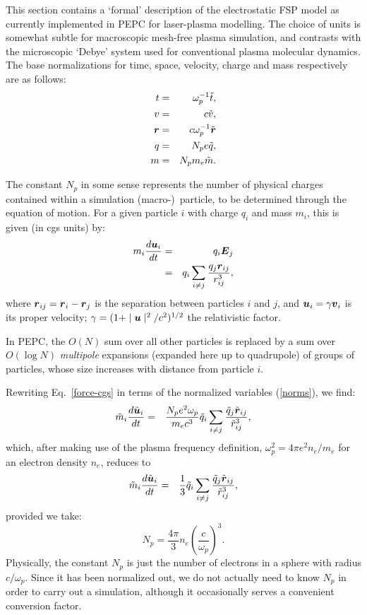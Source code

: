 \documentclass[11pt,psfig]{article}
\def\be{\begin{equation}}
\def\ee{\end{equation}}
\def\bea{\begin{eqnarray}}
\def\eea{\end{eqnarray}}
\newcommand{\bm}[1]{\mbox{\boldmath$#1$}}
\newcommand{\ddt}[1]{\frac{d #1}{d t}}
\newcommand{\half}{{1/2}}
\begin{document}
This section contains a `formal' description of the electrostatic FSP model as
currently implemented in PEPC for laser-plasma modelling.  The choice of units is somewhat subtle for
macroscopic mesh-free plasma simulation, and contrasts with the microscopic `Debye' system used for conventional plasma molecular dynamics.  The base normalizations for
time, space, velocity, charge and mass respectively are as follows:
\bea 
t &=& \omega_p^{-1}\tilde{t}, \nonumber\\ 
v&=&c\tilde{v}, \nonumber \\
 \bm{r} &=& c \omega_p^{-1}\tilde{\bm{r}} \nonumber \\
q&=& N_p e \tilde{q}, \nonumber \\ 
m &=& N_p m_e \tilde{m}.
\label{norms}
\eea

The constant $N_p$ in some sense represents the number of physical charges contained within a
simulation (macro-)~particle, to be determined through the equation of motion.
For a given particle $i$ with charge $q_i$ and mass $m_i$, this is given (in
cgs units) by: 
\bea
m_i \ddt{\bm{u}_i} &=& q_i \bm{E}_j \nonumber \\
              &=& q_i\sum_{i \neq j} \frac{q_j\bm{r}_{ij}}{r_{ij}^3},
\label{force-cgs}
\eea
where $\bm{r}_{ij} = \bm{r}_i-\bm{r}_j$ is the separation between particles $i$
and $j$, and $\bm{u}_i = \gamma \bm{v}_i$ is its proper velocity;
$\gamma=(1 +\mid\bm{u}\mid^2/c^2)^\half$
the relativistic factor.

In PEPC, the $O(N)$ sum over all other particles is replaced by a sum
over $O(\log N)$ \textit{multipole} expansions (expanded here up to quadrupole) of groups of particles, whose size
increases with distance from particle $i$.  
 
Rewriting Eq.~\ref{force-cgs} in terms of the normalized variables
(\ref{norms}), we find:
\bea
\tilde{m}_i \ddt{\tilde{\bm{u}}_i} 
    &=& \frac{N_pe^2\omega_p}{m_ec^3}\tilde{q}_i\sum_{i \neq j} \frac{\tilde{q}_j\tilde{\bm{r}}_{ij}}{\tilde{r}_{ij}^3},
              \nonumber 
\eea
which, after making use of the plasma frequency definition, $\omega_p^2 =
4\pi e^2n_e/m_e$ for an electron density $n_e$, reduces to
\bea
\tilde{m}_i \ddt{\tilde{\bm{u}}_i} 
    &=& \frac{1}{3}\tilde{q}_i\sum_{i \neq j}
    \frac{\tilde{q}_j\tilde{\bm{r}}_{ij}}{\tilde{r}_{ij}^3},
\label{force-norm}
\eea
provided we take:
\be
N_p = \frac{4\pi}{3} n_e \left(\frac{c}{\omega_p}\right)^3.
\label{Np}
\ee
Physically, the constant $N_p$ is just the number of electrons in a sphere
with radius $c/\omega_p$.  Since it has been normalized out, we do not
actually need to know $N_p$ in order to carry out a simulation, although it
occasionally serves a convenient conversion factor.
\end{document}
